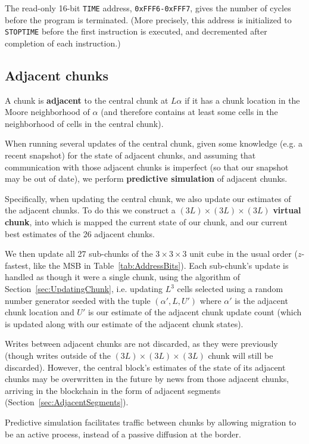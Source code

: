 \documentclass{article}
\newcommand\code[1]{{\tt #1}}
\newcommand\hex[1]{{\tt 0x#1}}
\newcommand\hexrange[2]{\hex{#1}{\tt -}\hex{#2}}
\begin{document}
The read-only 16-bit \code{TIME} address, \hexrange{FFF6}{FFF7}, gives the number of cycles before the program is terminated.
(More precisely, this address is initialized to \code{STOPTIME} before the first instruction is executed,
and decremented after completion of each instruction.)

\subsection{Adjacent chunks}
\label{sec:AdjacentCells}

A chunk is {\bf adjacent} to the central chunk at $L\alpha$
if it has a chunk location in the Moore neighborhood of $\alpha$
(and therefore contains at least some cells in the neighborhood of cells in the central chunk).

When running several updates of the central chunk,
given some knowledge (e.g. a recent snapshot) for the state of adjacent chunks,
and assuming that communication with those adjacent chunks is imperfect (so that our snapshot may be out of date),
we perform {\bf predictive simulation} of adjacent chunks.

Specifically, when updating the central chunk, we also update our estimates of the adjacent chunks.
To do this we construct a $(3L) \times (3L) \times (3L)$ {\bf virtual chunk},
into which is mapped the current state of our chunk, and our current best estimates of the 26 adjacent chunks.

We then update all 27 sub-chunks of the $3 \times 3 \times 3$ unit cube in the usual order ($z$-fastest, like the MSB in Table~\ref{tab:AddressBits}).
Each sub-chunk's update is handled as though it were a single chunk,
using the algorithm of Section~\ref{sec:UpdatingChunk},
i.e. updating $L^3$ cells selected using a random number generator seeded with the tuple $(\alpha',L,U')$
where $\alpha'$ is the adjacent chunk location and $U'$ is our estimate of the adjacent chunk update count
(which is updated along with our estimate of the adjacent chunk states).

Writes between adjacent chunks are not discarded, as they were previously
(though writes outside of the $(3L) \times (3L) \times (3L)$ chunk will still be discarded).
However, the central block's estimates of the state of its adjacent chunks
may be overwritten in the future by news from those adjacent chunks,
arriving in the blockchain in the form of adjacent segments (Section~\ref{sec:AdjacentSegments}).

Predictive simulation facilitates traffic between chunks
by allowing migration to be an active process, instead of a passive diffusion at the border.
\end{document}
